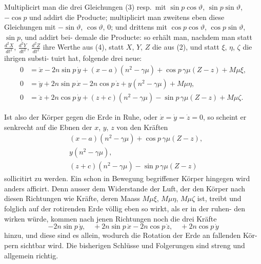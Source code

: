 \documentclass[12pt,a4paper]{article}
\begin{document}
Multiplicirt man die drei Gleichungen (3) resp.\ mit $\sin p\cos\vartheta$, $\sin p\sin\vartheta$, $-\cos p$ 
und addirt die Producte; multiplicirt man zweitens eben diese Gleichungen mit 
$-\sin\vartheta$, $\cos\vartheta$, $0$; und drittens mit $\cos p\cos\vartheta$, $\cos p\sin\vartheta$, $\sin p$, und addirt bei-
demale die Producte: so erhält man, nachdem man statt $\tfrac{d^2X}{dt^2}$, $\tfrac{d^2Y}{dt^2}$, $\tfrac{d^2Z}{dt^2}$ ihre 
Werthe aus (4), statt $X$, $Y$, $Z$ die aus (2), und statt $\xi$, $\eta$, $\zeta$ die ihrigen substi-
tuirt hat, folgende drei neue:
\begin{align}
0 &= \ddot{x} - 2n\sin p\,\dot{y} + (x-a)(n^2 - \gamma\mu) + \cos p\,\gamma\mu(Z-z) + M\mu\xi,\\
0 &= \ddot{y} + 2n\sin p\,\dot{x} - 2n\cos p\,\dot{z} + y(n^2 - \gamma\mu) + M\mu\eta,\\
0 &= \ddot{z} + 2n\cos p\,\dot{y} + (z+c)(n^2 - \gamma\mu) - \sin p\,\gamma\mu(Z-z) + M\mu\zeta.
\end{align}

Ist also der Körper gegen die Erde in Ruhe, oder $\dot{x} = \dot{y} = \dot{z} = 0$, so 
scheint er senkrecht auf die Ebnen der $x$, $y$, $z$ von den Kräften
\begin{align*}
&(x-a)(n^2 - \gamma\mu) + \cos p\,\gamma\mu(Z-z),\\
&y(n^2 - \gamma\mu),\\
&(z+c)(n^2 - \gamma\mu) - \sin p\,\gamma\mu(Z-z)
\end{align*}
sollicitirt zu werden. Ein schon in Bewegung begriffener Körper hingegen wird 
anders afficirt. Denn ausser dem Widerstande der Luft, der den Körper nach 
diesen Richtungen wie Kräfte, deren Maass $M\mu\xi$, $M\mu\eta$, $M\mu\zeta$ ist, treibt 
und folglich auf der rotirenden Erde völlig eben so wirkt, als er in der ruhen-
den wirken würde, kommen nach jenen Richtungen noch die drei Kräfte
\[
-2n\sin p\,\dot{y},\quad +2n\sin p\,\dot{x} - 2n\cos p\,\dot{z},\quad +2n\cos p\,\dot{y}
\]
hinzu, und diese sind es allein, wodurch die Rotation der Erde an fallenden Kör-
pern sichtbar wird. Die bisherigen Schlüsse und Folgerungen sind streng und 
allgemein richtig.
\end{document}
